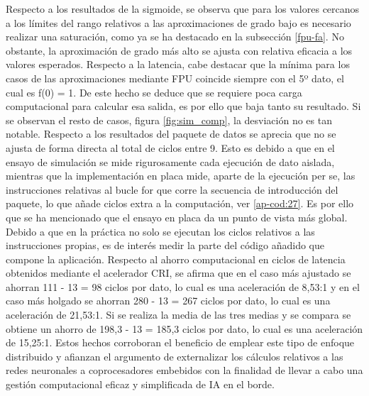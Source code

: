 Respecto a los resultados de la sigmoide, se observa que para los valores cercanos a los límites del rango relativos a las aproximaciones de grado bajo es necesario realizar una saturación, como ya se ha destacado en la subsección \ref{fpu-fa}.
No obstante, la aproximación de grado más alto se ajusta con relativa eficacia a los valores esperados.
Respecto a la latencia, cabe destacar que la mínima para los casos de las aproximaciones mediante FPU coincide siempre con el 5º dato, el cual es f(0) = 1.
De este hecho se deduce que se requiere poca carga computacional para calcular esa salida, es por ello que baja tanto su resultado.
Si se observan el resto de casos, figura \ref{fig:sim_comp}, la desviación no es tan notable.
Respecto a los resultados del paquete de datos se aprecia que no se ajusta de forma directa al total de ciclos entre 9.
Esto es debido a que en el ensayo de simulación se mide rigurosamente cada ejecución de dato aislada, mientras que la implementación en placa mide, aparte de la ejecución per se, las instrucciones relativas al bucle for que corre la secuencia de introducción del paquete, lo que añade ciclos extra a la computación, ver \ref{ap-cod:27}.
Es por ello que se ha mencionado que el ensayo en placa da un punto de vista más global.
Debido a que en la práctica no solo se ejecutan los ciclos relativos a las instrucciones propias, es de interés medir la parte del código añadido que compone la aplicación.
Respecto al ahorro computacional en ciclos de latencia obtenidos mediante el acelerador CRI, se afirma que en el caso más ajustado se ahorran 111 - 13 = 98 ciclos por dato, lo cual es una aceleración de 8,53:1 y en el caso más holgado se ahorran 280 - 13 = 267 ciclos por dato, lo cual es una aceleración de 21,53:1.
Si se realiza la media de las tres medias y se compara se obtiene un ahorro de 198,3 - 13 = 185,3 ciclos por dato, lo cual es una aceleración de 15,25:1.
Estos hechos corroboran el beneficio de emplear este tipo de enfoque distribuido y afianzan el argumento de externalizar los cálculos relativos a las redes neuronales a coprocesadores embebidos con la finalidad de llevar a cabo una gestión computacional eficaz y simplificada de IA en el borde.



